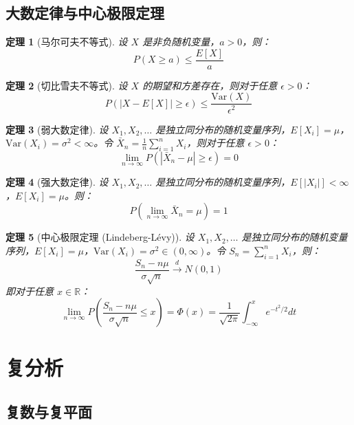 \documentclass[12pt]{article}
\newtheorem{theorem}{定理}[section]
\begin{document}
\subsection{大数定律与中心极限定理}

\begin{theorem}[马尔可夫不等式]
设 $X$ 是非负随机变量，$a > 0$，则：
$$P(X \geq a) \leq \frac{E[X]}{a}$$
\end{theorem}

\begin{theorem}[切比雪夫不等式]
设 $X$ 的期望和方差存在，则对于任意 $\epsilon > 0$：
$$P(|X - E[X]| \geq \epsilon) \leq \frac{\text{Var}(X)}{\epsilon^2}$$
\end{theorem}

\begin{theorem}[弱大数定律]
设 $X_1, X_2, \ldots$ 是独立同分布的随机变量序列，$E[X_i] = \mu$，$\text{Var}(X_i) = \sigma^2 < \infty$。令 $\bar{X}_n = \frac{1}{n}\sum_{i=1}^{n} X_i$，则对于任意 $\epsilon > 0$：
$$\lim_{n \to \infty} P(|\bar{X}_n - \mu| \geq \epsilon) = 0$$
\end{theorem}

\begin{theorem}[强大数定律]
设 $X_1, X_2, \ldots$ 是独立同分布的随机变量序列，$E[|X_i|] < \infty$，$E[X_i] = \mu$。则：
$$P\left(\lim_{n \to \infty} \bar{X}_n = \mu\right) = 1$$
\end{theorem}

\begin{theorem}[中心极限定理 (Lindeberg-Lévy)]
设 $X_1, X_2, \ldots$ 是独立同分布的随机变量序列，$E[X_i] = \mu$，$\text{Var}(X_i) = \sigma^2 \in (0, \infty)$。令 $S_n = \sum_{i=1}^{n} X_i$，则：
$$\frac{S_n - n\mu}{\sigma\sqrt{n}} \xrightarrow{d} N(0, 1)$$
即对于任意 $x \in \mathbb{R}$：
$$\lim_{n \to \infty} P\left(\frac{S_n - n\mu}{\sigma\sqrt{n}} \leq x\right) = \Phi(x) = \frac{1}{\sqrt{2\pi}} \int_{-\infty}^{x} e^{-t^2/2} dt$$
\end{theorem}


\section{复分析}

\subsection{复数与复平面}
\end{document}
